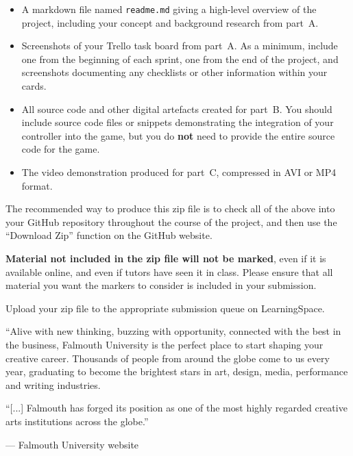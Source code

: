 \documentclass{../fal_assignment}
\begin{document}
\begin{itemize}
\item A markdown file named \texttt{readme.md} giving a high-level overview of the project,
    including your concept and background research from part~A.
\item Screenshots of your Trello task board from part~A.
    As a minimum, include one from the beginning of each sprint,
    one from the end of the project,
    and screenshots documenting any checklists or other information within your cards.
\item All source code and other digital artefacts created for part~B.
    You should include source code files or snippets demonstrating the integration of your controller into the game,
    but you do \textbf{not} need to provide the entire source code for the game.
\item The video demonstration produced for part~C, compressed in AVI or MP4 format.
\end{itemize}

The recommended way to produce this zip file is to check all of the above into your GitHub repository
throughout the course of the project,
and then use the ``Download Zip'' function on the GitHub website.

\textbf{Material not included in the zip file will not be marked},
even if it is available online, and even if tutors have seen it in class.
Please ensure that all material you want the markers to consider is included in your submission.

Upload your zip file to the appropriate submission queue on LearningSpace.

\begin{marginquote}
    ``Alive with new thinking, buzzing with opportunity, connected with the best in the business,
    Falmouth University is the perfect place to start shaping your creative career.
    Thousands of people from around the globe come to us every year,
    graduating to become the brightest stars in art, design, media, performance and writing industries.

    ``[...]
    Falmouth has forged its position as one of the most highly regarded creative arts institutions across the globe.''
    
    --- Falmouth University website
\end{marginquote}
\end{document}
